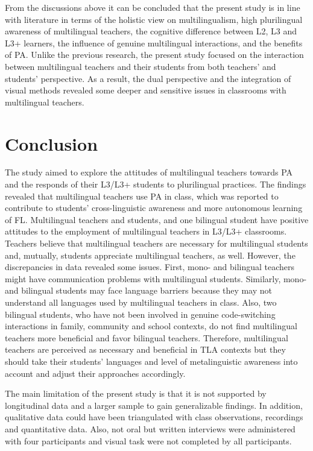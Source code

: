 \documentclass[output=paper]{../langscibook}
\begin{document}
From the discussions above it can be concluded that the present study is in line with literature in terms of the holistic view on multilingualism, high plurilingual awareness of multilingual teachers, the cognitive difference between L2, L3 and L3+ learners, the influence of genuine multilingual interactions, and the benefits of PA. Unlike the previous research, the present study focused on the interaction between multilingual teachers and their students from both teachers’ and students’ perspective. As a result, the dual perspective and the integration of visual methods revealed some deeper and sensitive issues in classrooms with multilingual teachers.


\section{Conclusion}


The study aimed to explore the attitudes of multilingual teachers towards PA and the responds of their L3/L3+ students to plurilingual practices. The findings revealed that multilingual teachers use PA in class, which was reported to contribute to students’ cross-linguistic awareness and more autonomous learning of FL. Multilingual teachers and students, and one bilingual student have positive attitudes to the employment of multilingual teachers in L3/L3+ classrooms. Teachers believe that multilingual teachers are necessary for multilingual students and, mutually, students appreciate multilingual teachers, as well. However, the discrepancies in data revealed some issues. First, mono- and bilingual teachers might have communication problems with multilingual students. Similarly, mono- and bilingual students may face language barriers because they may not understand all languages used by multilingual teachers in class. Also, two bilingual students, who have not been involved in genuine code-switching interactions in family, community and school contexts, do not find multilingual teachers more beneficial and favor bilingual teachers. Therefore, multilingual teachers are perceived as necessary and beneficial in TLA contexts but they should take their students’ languages and level of metalinguistic awareness into account and adjust their approaches accordingly.

The main limitation of the present study is that it is not supported by longitudinal data and a larger sample to gain generalizable findings. In addition, qualitative data could have been triangulated with class observations, recordings and quantitative data. Also, not oral but written interviews \citep{James2007} were administered with four participants and visual task were not completed by all participants. 
\end{document}
